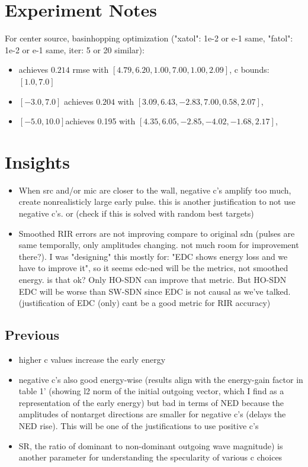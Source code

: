 \documentclass[conference]{IEEEtran}
\begin{document}
\newpage
\section{Experiment Notes}
\label{sec:experiment_notes}

For center source, basinhopping optimization ("xatol": 1e-2 or e-1 same, "fatol": 1e-2 or e-1 same, iter: 5 or 20 similar):
\begin{itemize}
\item achieves $0.214$ rmse with $[4.79,6.20,1.00,7.00,1.00,2.09]$, 
c bounds: $[1.0, 7.0]$
\item $[-3.0, 7.0]$ achieves $0.204$ with $[3.09,6.43,-2.83,7.00,0.58,2.07]$, 
\item $[-5.0, 10.0]$achieves 0.195 with $[4.35,6.05,-2.85,-4.02,-1.68,2.17]$, 

\end{itemize}

\section{Insights}
\label{sec:insights}

\begin{itemize}

\item When src and/or mic are closer to the wall, negative c's amplify too much, create nonrealisticly large early pulse. this is another justification to not use negative c's. or (check if this is solved with random best targets)
\item Smoothed RIR errors are not improving compare to original sdn (pulses are same temporally, only amplitudes changing. not much room for improvement there?). I was "designing" this mostly for: "EDC shows energy loss and we have to improve it", so it seems edc-ned will be the metrics, not smoothed energy. is that ok? Only HO-SDN can improve that metric. But HO-SDN EDC will be worse than SW-SDN since EDC is not causal as we've talked. (justification of EDC (only) cant be a good metric for RIR accuracy)
\end{itemize}

\subsection{\textbf{Previous}}
\begin{itemize}

\item higher c values increase the early energy  
\item negative c's also good energy-wise (results align with the energy-gain factor in table 1' (showing l2 norm of the initial outgoing vector, which I find as a representation of the early energy) but bad in terms of NED because the amplitudes of nontarget directions are smaller for negative c's (delays the NED rise). This will be one of the justifications to use positive c's
\item SR, the ratio of dominant to non-dominant
outgoing wave magnitude) is another parameter for understanding the specularity of various c choices 
 \end{itemize}
\end{document}
